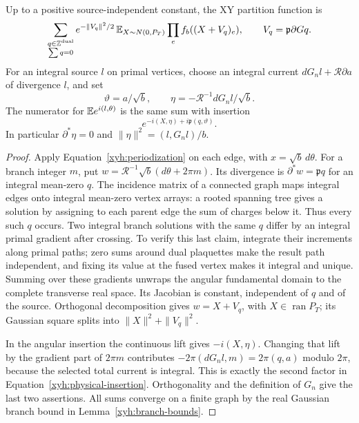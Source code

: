 \begin{proposition}\label{xyh:branch}
Up to a positive source-independent constant, the XY partition function is
\begin{equation}\label{xyh:positive-ensemble}
 \sum_{\substack{q\in\mathbb Z^{\mathrm{dual}}\\\sum q=0}}
 e^{-\|V_q\|^2/2}\,
 \mathbb E_{X\sim N(0,P_T)}\prod_e f_b((X+V_q)_e),
 \qquad V_q=\mathfrak p\partial Gq.
\end{equation}
For an integral source $l$ on primal vertices, choose an integral current
$dG_n l+\mathcal R\partial a$ of divergence $l$, and set
\[
 \vartheta=a/\sqrt b,\qquad
 \eta=-\mathcal R^{-1}dG_n l/\sqrt b.
\]
The numerator for $\mathbb E e^{i(l,\theta)}$ is the same sum with insertion
\begin{equation}\label{xyh:physical-insertion}
 e^{-i(X,\eta)+i\mathfrak p(q,\vartheta)}.
\end{equation}
In particular $\partial^*\eta=0$ and
$\|\eta\|^2=(l,G_nl)/b$.
\end{proposition}
\begin{proof}
Apply Equation~\eqref{xyh:periodization} on each edge, with
$x=\sqrt b\,d\theta$. For a branch integer $m$, put
$w=\mathcal R^{-1}\sqrt b(d\theta+2\pi m)$.
Its divergence is $\partial^*w=\mathfrak p q$ for an integral mean-zero
$q$. The incidence matrix of a connected graph maps integral edges onto
integral mean-zero vertex arrays: a rooted spanning tree gives a solution
by assigning to each parent edge the sum of charges below it. Thus every
such $q$ occurs. Two integral branch solutions with the same $q$ differ
by an integral primal gradient after crossing. To verify this last claim,
integrate their increments along primal paths; zero sums around dual
plaquettes make the result path independent, and fixing its value at the
fused vertex makes it integral and unique. Summing over these gradients
unwraps the angular fundamental domain to the complete transverse real
space. Its Jacobian is constant, independent of $q$ and of the source.
Orthogonal decomposition gives $w=X+V_q$, with $X\in\operatorname{ran}P_T$;
its Gaussian square splits into $\|X\|^2+\|V_q\|^2$.

In the angular insertion the continuous lift gives $-i(X,\eta)$.
Changing that lift by the gradient part of $2\pi m$ contributes
$-2\pi(dG_nl,m)=2\pi(q,a)$ modulo $2\pi$, because the selected total
current is integral. This is exactly the second factor in
Equation~\eqref{xyh:physical-insertion}. Orthogonality and the definition
of $G_n$ give the last two assertions. All sums converge on a finite graph
by the real Gaussian branch bound in Lemma~\ref{xyh:branch-bounds}.
\end{proof}

